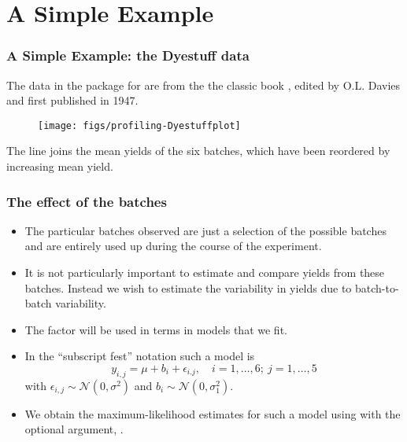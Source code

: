 \documentclass[dvipsnames,pdflatex,beamer]{beamer}
\begin{document}
\section{A Simple Example}

\begin{frame}[fragile]
  \frametitle{A Simple Example: the Dyestuff data}
  The  data in the  package for  are from the 
  the classic book , edited by O.L. Davies  and first published
  in 1947.
  \begin{figure}[tb]
    \centering
\texttt{[image: figs/profiling-Dyestuffplot]}
  \end{figure}
The line joins the mean yields of the six batches, which have been
reordered by increasing mean yield.
\end{frame}

\begin{frame}
  \frametitle{The effect of the batches}
  \begin{itemize}
  \item The particular batches observed are just a selection of the
    possible batches and are entirely used up during the course of
    the experiment.  
  \item It is not particularly important to estimate and compare
    yields from these batches.  Instead we wish to estimate the
    variability in yields due to batch-to-batch variability.
  \item The  factor will be used in 
    terms in models that we fit.
  \item In the ``subscript fest'' notation such a model is
    \begin{displaymath}
      y_{i,j}=\mu + b_i+\epsilon_{i.j},\quad i=1,\dots,6;\: j=1,\dots,5
    \end{displaymath}
    with $\epsilon_{i,j}\sim\mathcal{N}(0,\sigma^2)$ and $b_i\sim\mathcal{N}(0,\sigma_1^2)$.
  \item We obtain the maximum-likelihood estimates for such a model
    using  with the optional argument, .
  \end{itemize}
\end{frame}
\end{document}
